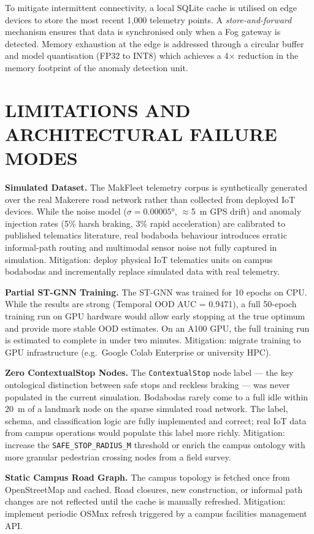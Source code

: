 \documentclass{ieeeaccess}
\begin{document}
To mitigate intermittent connectivity, a local SQLite cache is utilised on edge devices to store the most recent 1,000 telemetry points. A
\textit{store-and-forward} mechanism ensures that data is synchronised only when a Fog gateway is detected. Memory exhaustion at the edge is
addressed through a circular buffer and model quantisation (FP32 to INT8) which achieves a 4$\times$ reduction in the memory footprint of
the anomaly detection unit.


\section{LIMITATIONS AND ARCHITECTURAL FAILURE MODES}
\label{sec:limitations}

\textbf{Simulated Dataset.}
The MakFleet telemetry corpus is synthetically generated over the real
Makerere road network rather than collected from deployed IoT devices.
While the noise model ($\sigma = 0.00005°$, $\approx$5~m GPS drift)
and anomaly injection rates (5\% harsh braking, 3\% rapid
acceleration) are calibrated to published telematics literature, real
bodaboda behaviour introduces erratic informal-path routing and
multimodal sensor noise not fully captured in simulation. Mitigation:
deploy physical IoT telematics units on campus bodabodas and
incrementally replace simulated data with real telemetry.

\textbf{Partial ST-GNN Training.}
The ST-GNN was trained for 10 epochs on CPU. While the results are
strong (Temporal OOD AUC = 0.9471), a full 50-epoch training run on
GPU hardware would allow early stopping at the true optimum and provide
more stable OOD estimates. On an A100 GPU, the full training run is
estimated to complete in under two minutes.
Mitigation: migrate training to GPU infrastructure (e.g.\ Google Colab
Enterprise or university HPC).

\textbf{Zero ContextualStop Nodes.}
The \texttt{ContextualStop} node label --- the key ontological
distinction between safe stops and reckless braking --- was never
populated in the current simulation. Bodabodas rarely come to a full
idle within 20~m of a landmark node on the sparse simulated road
network. The label, schema, and classification logic are fully
implemented and correct; real IoT data from campus operations would
populate this label more richly.
Mitigation: increase the \texttt{SAFE\_STOP\_RADIUS\_M} threshold or
enrich the campus ontology with more granular pedestrian crossing
nodes from a field survey.

\textbf{Static Campus Road Graph.}
The campus topology is fetched once from OpenStreetMap and cached.
Road closures, new construction, or informal path changes are not
reflected until the cache is manually refreshed.
Mitigation: implement periodic OSMnx refresh triggered by a campus
facilities management API.
\end{document}
